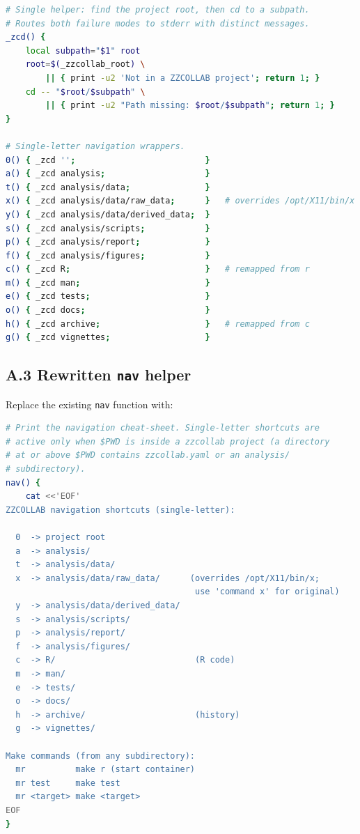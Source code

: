 \documentclass[11pt,letterpaper]{scrartcl}
\begin{document}
\begin{lstlisting}[language=bash]
# Single helper: find the project root, then cd to a subpath.
# Routes both failure modes to stderr with distinct messages.
_zcd() {
    local subpath="$1" root
    root=$(_zzcollab_root) \
        || { print -u2 'Not in a ZZCOLLAB project'; return 1; }
    cd -- "$root/$subpath" \
        || { print -u2 "Path missing: $root/$subpath"; return 1; }
}

# Single-letter navigation wrappers.
0() { _zcd '';                          }
a() { _zcd analysis;                    }
t() { _zcd analysis/data;               }
x() { _zcd analysis/data/raw_data;      }   # overrides /opt/X11/bin/x
y() { _zcd analysis/data/derived_data;  }
s() { _zcd analysis/scripts;            }
p() { _zcd analysis/report;             }
f() { _zcd analysis/figures;            }
c() { _zcd R;                           }   # remapped from r
m() { _zcd man;                         }
e() { _zcd tests;                       }
o() { _zcd docs;                        }
h() { _zcd archive;                     }   # remapped from c
g() { _zcd vignettes;                   }
\end{lstlisting}

\subsection*{A.3 Rewritten \texttt{nav} helper}

Replace the existing \texttt{nav} function with:

\begin{lstlisting}[language=bash]
# Print the navigation cheat-sheet. Single-letter shortcuts are
# active only when $PWD is inside a zzcollab project (a directory
# at or above $PWD contains zzcollab.yaml or an analysis/
# subdirectory).
nav() {
    cat <<'EOF'
ZZCOLLAB navigation shortcuts (single-letter):

  0  -> project root
  a  -> analysis/
  t  -> analysis/data/
  x  -> analysis/data/raw_data/      (overrides /opt/X11/bin/x;
                                      use 'command x' for original)
  y  -> analysis/data/derived_data/
  s  -> analysis/scripts/
  p  -> analysis/report/
  f  -> analysis/figures/
  c  -> R/                            (R code)
  m  -> man/
  e  -> tests/
  o  -> docs/
  h  -> archive/                      (history)
  g  -> vignettes/

Make commands (from any subdirectory):
  mr          make r (start container)
  mr test     make test
  mr <target> make <target>
EOF
}
\end{lstlisting}
\end{document}
